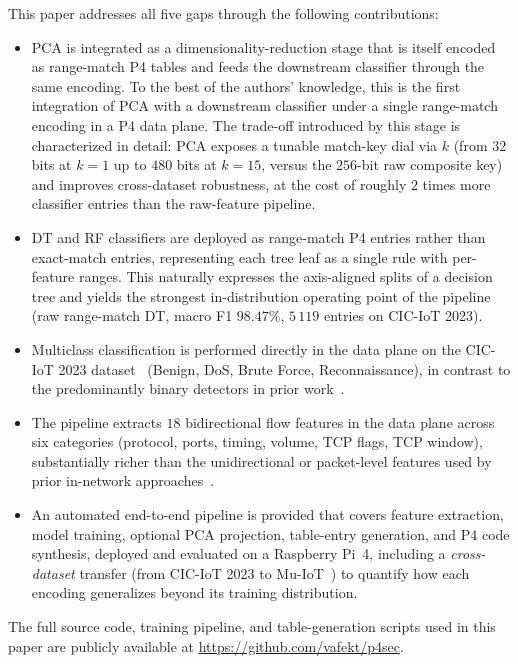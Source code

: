 \documentclass[runningheads]{llncs}
\begin{document}
This paper addresses all five gaps through the following contributions:

\begin{itemize}
    \item PCA is integrated as a dimensionality-reduction stage that is itself encoded as range-match P4 tables and feeds the downstream classifier through the same encoding. To the best of the authors' knowledge, this is the first integration of PCA with a downstream classifier under a single range-match encoding in a P4 data plane. The trade-off introduced by this stage is characterized in detail: PCA exposes a tunable match-key dial via $k$ (from $32$ bits at $k{=}1$ up to $480$ bits at $k{=}15$, versus the $256$-bit raw composite key) and improves cross-dataset robustness, at the cost of roughly $2$ times more classifier entries than the raw-feature pipeline.
    \item DT and RF classifiers are deployed as range-match P4 entries rather than exact-match entries, representing each tree leaf as a single rule with per-feature ranges. This naturally expresses the axis-aligned splits of a decision tree and yields the strongest in-distribution operating point of the pipeline (raw range-match DT, macro F1 $98.47\%$, $5\,119$ entries on CIC-IoT 2023).
    \item Multiclass classification is performed directly in the data plane on the CIC-IoT 2023 dataset~\cite{Neto2023} (Benign, DoS, Brute Force, Reconnaissance), in contrast to the predominantly binary detectors in prior work~\cite{Ilha20213121,Musumeci2022,Lee202523143}.
    \item The pipeline extracts $18$ bidirectional flow features in the data plane across six categories (protocol, ports, timing, volume, TCP flags, TCP window), substantially richer than the unidirectional or packet-level features used by prior in-network approaches~\cite{Nguyen2024,Akem2024,Zang20249244}.
    \item An automated end-to-end pipeline is provided that covers feature extraction, model training, optional PCA projection, table-entry generation, and P4 code synthesis, deployed and evaluated on a Raspberry Pi~4, including a \emph{cross-dataset} transfer (from CIC-IoT 2023 to Mu-IoT~\cite{Clinton2024muiot}) to quantify how each encoding generalizes beyond its training distribution.
\end{itemize}

The full source code, training pipeline, and table-generation scripts used in this paper are publicly available at \url{https://github.com/vafekt/p4sec}.
\end{document}
